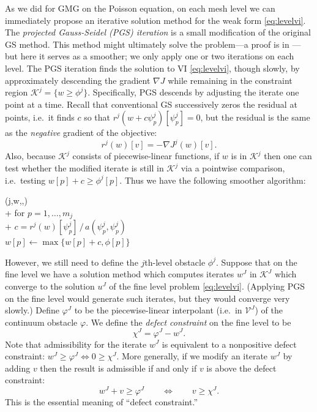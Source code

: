 \documentclass[letterpaper,final,12pt,reqno]{amsart}
\theoremstyle{claim}
\newcommand{\grad}{\nabla}
\numberwithin{equation}{section}
\numberwithin{figure}{section}
\numberwithin{table}{section}
\begin{document}
As we did for GMG on the Poisson equation, on each mesh level we can immediately propose an iterative solution method for the weak form \eqref{eq:levelvi}.  The \emph{projected Gauss-Seidel (PGS) iteration} is a small modification of the original GS method.  This method might ultimately solve the problem---a proof is in \cite{BrandtCryer1983}---but here it serves as a smoother; we only apply one or two iterations on each level.  The PGS iteration finds the solution to VI \eqref{eq:levelvi}, though slowly, by approximately descending the gradient $\grad J$ while remaining in the constraint region $\mathcal{K}^j = \{w\ge \phi^j\}$.  Specifically, PGS descends by adjusting the iterate one point at a time.  Recall that conventional GS successively zeros the residual at points, i.e.~it finds $c$ so that $r^j(w+c\psi_p^j)[\psi_p^j]=0$, but the residual is the same as the \emph{negative} gradient of the objective:
\begin{equation}
  r^j(w)[v] = - \grad J^j(w)[v].  \label{eq:levelresidualgradient}
\end{equation}
Also, because $\mathcal{K}^j$ consists of piecewise-linear functions, if $w$ is in $\mathcal{K}^j$ then one can test whether the modified iterate is still in $\mathcal{K}^j$ via a pointwise comparison, i.e.~testing $w[p] + c \ge \phi^j[p]$.  Thus we have the following smoother algorithm:
\begin{pseudo*}
(j,w,\ell,\phi)\text{:} \\+
    for $p=1,\dots,m_j$ \\+
        $\displaystyle c = r^j(w)[\psi_p^j] \, \big/ \,a(\psi_p^j,\psi_p^j)$ \qquad {} \\
        $w[p] \gets \max\{w[p] + c,\phi[p]\}$
\end{pseudo*}

However, we still need to define the $j$th-level obstacle $\phi^j$.  Suppose that on the fine level we have a solution method which computes iterates $w^J$ in $\mathcal{K}^J$ which converge to the solution $u^J$ of the fine level problem \eqref{eq:levelvi}.  (Applying PGS on the fine level would generate such iterates, but they would converge very slowly.)  Define $\varphi^J$ to be the piecewise-linear interpolant (i.e.~in $\mathcal{V}^J$) of the continuum obstacle $\varphi$.  We define the \emph{defect constraint} \cite{GraeserKornhuber2009} on the fine level to be
\begin{equation}
  \chi^J = \varphi^J - w^J.  \label{eq:defectconstraint}
\end{equation}
Note that admissibility for the iterate $w^J$ is equivalent to a nonpositive defect constraint: $w^J \ge \varphi^J \iff 0 \ge \chi^J$.  More generally, if we modify an iterate $w^J$ by adding $v$ then the result is admissible if and only if $v$ is above the defect constraint:
\begin{equation}
  w^J + v \ge \varphi^J  \qquad \iff \qquad v \ge \chi^J.  \label{eq:defectmeaning}
\end{equation}
This is the essential meaning of ``defect constraint.''
\end{document}
